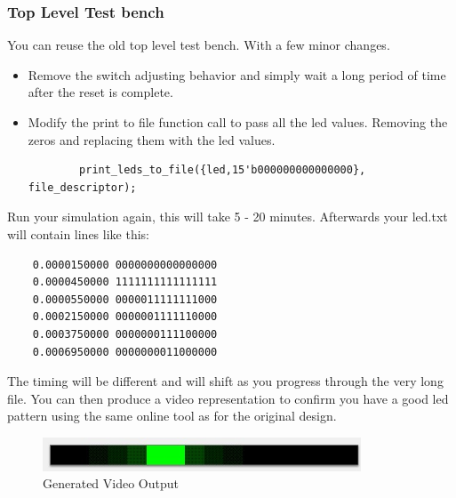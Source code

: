 \subsubsection{Top Level Test bench}
You can reuse the old top level test bench. With a few minor changes. 
\begin{itemize}
    \item Remove the switch adjusting behavior and simply wait a long period of time after the reset is complete.
    \item Modify the print to file function call to pass all the led values. Removing the zeros and replacing them with the led values. \begin{verbatim}
        print_leds_to_file({led,15'b000000000000000}, file_descriptor);
    \end{verbatim}
\end{itemize}

Run your simulation again, this will take 5 - 20 minutes. Afterwards your led.txt will contain lines like this:
\begin{verbatim}
    0.0000150000 0000000000000000
    0.0000450000 1111111111111111
    0.0000550000 0000011111111000
    0.0002150000 0000001111110000
    0.0003750000 0000000111100000
    0.0006950000 0000000011000000
\end{verbatim}
The timing will be different and will shift as you progress through the very long file. You can then produce a video representation to confirm you have a good led pattern using the same online tool as for the original design. 

\begin{figure}[H]
    \centering
    \includegraphics[height=1cm]{Images/ProvidedPWM/FinalOutput.jpg}
    \caption{Generated Video Output}
    \label{fig:enter-label}
\end{figure}